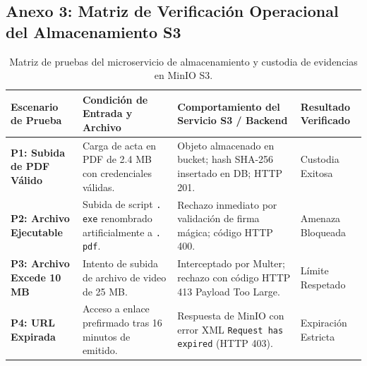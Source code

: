 \documentclass[12pt,a4paper]{article}
\begin{document}
\subsection*{Anexo 3: Matriz de Verificación Operacional del Almacenamiento S3}
\begin{table}[H]
\centering
\small
\renewcommand{\arraystretch}{1.15}
\begin{tabularx}{\textwidth}{|>{\hsize=0.75\hsize\raggedright\arraybackslash\bfseries\footnotesize}X|>{\hsize=1.25\hsize\raggedright\arraybackslash\footnotesize}X|>{\hsize=1.35\hsize\raggedright\arraybackslash\footnotesize}X|>{\hsize=0.65\hsize\centering\arraybackslash\footnotesize}X|}
\hline
\rowcolor{tableheader}
\textbf{Escenario de Prueba} & \textbf{Condición de Entrada y Archivo} & \textbf{Comportamiento del Servicio S3 / Backend} & \textbf{Resultado Verificado} \\
\hline
P1: Subida de PDF Válido & Carga de acta en PDF de 2.4 MB con credenciales válidas. & Objeto almacenado en bucket; hash SHA-256 insertado en DB; HTTP 201. & Custodia Exitosa \\
\hline
P2: Archivo Ejecutable & Subida de script \texttt{. exe} renombrado artificialmente a \texttt{. pdf}. & Rechazo inmediato por validación de firma mágica; código HTTP 400. & Amenaza Bloqueada \\
\hline
P3: Archivo Excede 10 MB & Intento de subida de archivo de video de 25 MB. & Interceptado por Multer; rechazo con código HTTP 413 Payload Too Large. & Límite Respetado \\
\hline
P4: URL Expirada & Acceso a enlace prefirmado tras 16 minutos de emitido. & Respuesta de MinIO con error XML \texttt{Request has expired} (HTTP 403). & Expiración Estricta \\
\hline
\end{tabularx}
\caption{Matriz de pruebas del microservicio de almacenamiento y custodia de evidencias en MinIO S3.}
\end{table}
\end{document}
